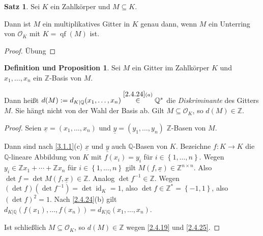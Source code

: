 \documentclass[
twoside=semi,
fontsize=12,
DIV=12, 
cleardoublepage=current,
leqno,
headings=optiontoheadandtoc, 
toc=idx
]{scrbook}
\newcommand{\Z}{\mathbb{Z}}
\newcommand{\Q}{\mathbb{Q}}
\newcommand{\set}[1]{\left\{ #1 \right\}}
\DeclareMathOperator{\id}{id}
\DeclareMathOperator{\qf}{qf}
\theoremstyle{definition}
\newtheorem{satz}[definition]{Satz}
\newtheorem{def-prop}[definition]{Definition und Proposition}
\begin{document}
	\begin{satz}\label{3.1.5}\hfill\newline
		Sei $K$ ein Zahlk\"orper und $M \subseteq K$. 
		
		\medskip\noindent
		Dann ist $M$ ein multiplikatives Gitter in $K$ genau dann, wenn $M$ ein Unterring von $\mathcal{O}_K$ mit $K = \qf(M)$ ist.
		
		\begin{proof}
			\"Ubung
		\end{proof}
	\end{satz}

	\begin{def-prop}\label{3.1.6}\hfill\newline
		Sei $M$ ein Gitter im Zahlk\"orper $K$ und $x_1, \dots, x_n$ ein $\Z$-Basis von $M$.
		
		\medskip\noindent
		Dann hei\ss t $d(M) := d_{K|\Q}(x_1, \dots, x_n) \overset{\ref{2.4.24}(a)}{\in} \Q^*$ die \emph{Diskriminante} des Gitters $M$. Sie h\"angt nicht 
		von der Wahl der Basis ab. Gilt $M \subseteq \mathcal{O}_K$, so $d(M) \in \Z$.
		
		\begin{proof}
			Seien $\underline{x} = (x_1, \dots, x_n)$ und $\underline{y} = (y_1, \dots, y_n)$ $\Z$-Basen von $M$. 
			
			Dann sind nach \ref{3.1.1}(c) $\underline{x}$ und $\underline{y}$ auch $\Q$-Basen von $K$. Bezeichne $f:K\to K$ die \linebreak $\Q$-lineare Abbildung von $K$ mit 
			$f(x_i) = y_i$ f\"ur $i \in \set{1,\dots, n}$. Wegen \linebreak $y_i \in \Z x_1 + \cdots + \Z x_n$ f\"ur $i \in \set{1,\dots, n}$ gilt $M(f, \underline{x}) \in \Z^{n\times n}$.
			Also $\det f = \det M(f, \underline{x}) \in \Z$.
			Analog $\det f^{-1} \in \Z$. Wegen $(\det f) (\det f^{-1}) = \det \id_K = 1$, also $\det f \in \Z^* = \set{-1, 1}$, also $(\det f)^2 = 1$. Nach \ref{2.4.24}(b) gilt 
			$d_{K|\Q}(f(x_1), \dots, f(x_n)) = d_{K|\Q}(x_1, \dots, x_n)$.
			
			Ist schlie\ss lich $M \subseteq \mathcal{O}_K$, so $d(M) \in \Z$ wegen \ref{2.4.19} und \ref{2.4.25}. 
		\end{proof}
	\end{def-prop}
\end{document}
